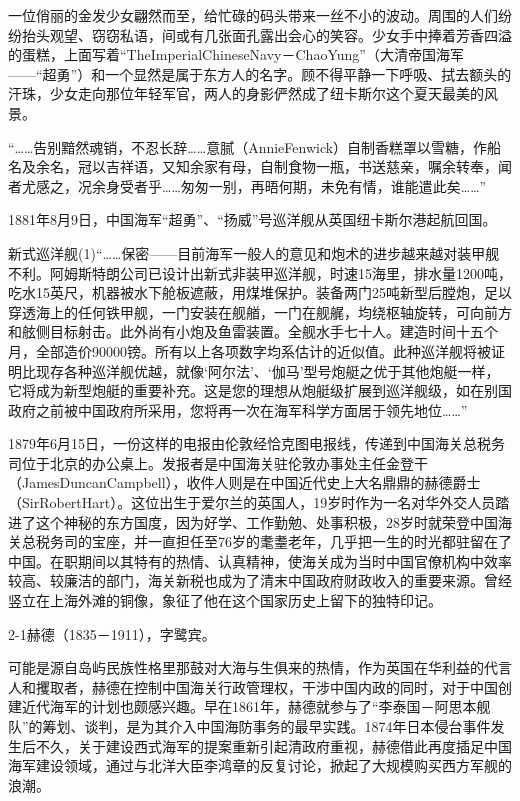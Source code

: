 \documentclass[12pt,UTF8]{ctexbook}
\begin{document}
一位俏丽的金发少女翩然而至，给忙碌的码头带来一丝不小的波动。周围的人们纷纷抬头观望、窃窃私语，间或有几张面孔露出会心的笑容。少女手中捧着芳香四溢的蛋糕，上面写着“TheImperialChineseNavy－ChaoYung”（大清帝国海军——“超勇”）和一个显然是属于东方人的名字。顾不得平静一下呼吸、拭去额头的汗珠，少女走向那位年轻军官，两人的身影俨然成了纽卡斯尔这个夏天最美的风景。

“……告别黯然魂销，不忍长辞……意腻（AnnieFenwick）自制香糕罩以雪糖，作船名及余名，冠以吉祥语，又知余家有母，自制食物一瓶，书送慈亲，嘱余转奉，闻者尤感之，况余身受者乎……匆匆一别，再晤何期，未免有情，谁能遣此矣……”

1881年8月9日，中国海军“超勇”、“扬威”号巡洋舰从英国纽卡斯尔港起航回国。

新式巡洋舰(1)“……保密——目前海军一般人的意见和炮术的进步越来越对装甲舰不利。阿姆斯特朗公司已设计出新式非装甲巡洋舰，时速15海里，排水量1200吨，吃水15英尺，机器被水下舱板遮蔽，用煤堆保护。装备两门25吨新型后膛炮，足以穿透海上的任何铁甲舰，一门安装在舰艏，一门在舰艉，均绕枢轴旋转，可向前方和舷侧目标射击。此外尚有小炮及鱼雷装置。全舰水手七十人。建造时间十五个月，全部造价90000镑。所有以上各项数字均系估计的近似值。此种巡洋舰将被证明比现存各种巡洋舰优越，就像‘阿尔法’、‘伽马’型号炮艇之优于其他炮艇一样，它将成为新型炮艇的重要补充。这是您的理想从炮艇级扩展到巡洋舰级，如在别国政府之前被中国政府所采用，您将再一次在海军科学方面居于领先地位……”

1879年6月15日，一份这样的电报由伦敦经恰克图电报线，传递到中国海关总税务司位于北京的办公桌上。发报者是中国海关驻伦敦办事处主任金登干（JamesDuncanCampbell），收件人则是在中国近代史上大名鼎鼎的赫德爵士（SirRobertHart）。这位出生于爱尔兰的英国人，19岁时作为一名对华外交人员踏进了这个神秘的东方国度，因为好学、工作勤勉、处事积极，28岁时就荣登中国海关总税务司的宝座，并一直担任至76岁的耄耋老年，几乎把一生的时光都驻留在了中国。在职期间以其特有的热情、认真精神，使海关成为当时中国官僚机构中效率较高、较廉洁的部门，海关新税也成为了清末中国政府财政收入的重要来源。曾经竖立在上海外滩的铜像，象征了他在这个国家历史上留下的独特印记。

2-1赫德（1835－1911），字鹭宾。

可能是源自岛屿民族性格里那鼓对大海与生俱来的热情，作为英国在华利益的代言人和攫取者，赫德在控制中国海关行政管理权，干涉中国内政的同时，对于中国创建近代海军的计划也颇感兴趣。早在1861年，赫德就参与了“李泰国－阿思本舰队”的筹划、谈判，是为其介入中国海防事务的最早实践。1874年日本侵台事件发生后不久，关于建设西式海军的提案重新引起清政府重视，赫德借此再度插足中国海军建设领域，通过与北洋大臣李鸿章的反复讨论，掀起了大规模购买西方军舰的浪潮。
\end{document}

